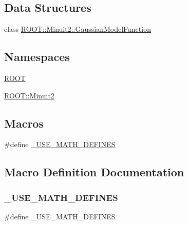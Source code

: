 \subsection*{Data Structures}
\begin{DoxyCompactItemize}
\item 
class \mbox{\hyperlink{classROOT_1_1Minuit2_1_1GaussianModelFunction}{R\+O\+O\+T\+::\+Minuit2\+::\+Gaussian\+Model\+Function}}
\end{DoxyCompactItemize}
\subsection*{Namespaces}
\begin{DoxyCompactItemize}
\item 
 \mbox{\hyperlink{namespaceROOT}{R\+O\+OT}}
\item 
 \mbox{\hyperlink{namespaceROOT_1_1Minuit2}{R\+O\+O\+T\+::\+Minuit2}}
\end{DoxyCompactItemize}
\subsection*{Macros}
\begin{DoxyCompactItemize}
\item 
\#define \mbox{\hyperlink{adat-devel_2other__libs_2minuit_2test_2MnSim_2GaussianModelFunction_8h_a525335710b53cb064ca56b936120431e}{\+\_\+\+U\+S\+E\+\_\+\+M\+A\+T\+H\+\_\+\+D\+E\+F\+I\+N\+ES}}
\end{DoxyCompactItemize}


\subsection{Macro Definition Documentation}
\mbox{\label{adat-devel_2other__libs_2minuit_2test_2MnSim_2GaussianModelFunction_8h_a525335710b53cb064ca56b936120431e}} 
\subsubsection{\texorpdfstring{\_USE\_MATH\_DEFINES}{\_USE\_MATH\_DEFINES}}
{\footnotesize\ttfamily \#define \+\_\+\+U\+S\+E\+\_\+\+M\+A\+T\+H\+\_\+\+D\+E\+F\+I\+N\+ES}

